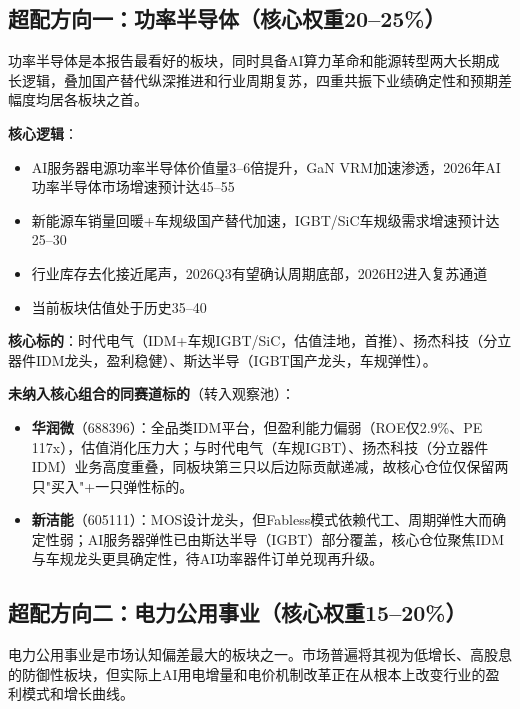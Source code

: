 \subsection{超配方向一：功率半导体（核心权重20--25\%）}

功率半导体是本报告最看好的板块，同时具备AI算力革命和能源转型两大长期成长逻辑，叠加国产替代纵深推进和行业周期复苏，四重共振下业绩确定性和预期差幅度均居各板块之首。

\textbf{核心逻辑}：
\vspace{0.2em}
\begin{itemize}[leftmargin=2em]
\item AI服务器电源功率半导体价值量3--6倍提升，GaN VRM加速渗透，2026年AI功率半导体市场增速预计达45--55%
\item 新能源车销量回暖+车规级国产替代加速，IGBT/SiC车规级需求增速预计达25--30%
\item 行业库存去化接近尾声，2026Q3有望确认周期底部，2026H2进入复苏通道
\item 当前板块估值处于历史35--40%
\end{itemize}

\textbf{核心标的}：时代电气（IDM+车规IGBT/SiC，估值洼地，首推）、扬杰科技（分立器件IDM龙头，盈利稳健）、斯达半导（IGBT国产龙头，车规弹性）。

\textbf{未纳入核心组合的同赛道标的}（转入观察池）：
\vspace{0.2em}
\begin{itemize}[leftmargin=2em]
\item \textbf{华润微}（688396）：全品类IDM平台，但盈利能力偏弱（ROE仅2.9\%、PE 117x），估值消化压力大；与时代电气（车规IGBT）、扬杰科技（分立器件IDM）业务高度重叠，同板块第三只以后边际贡献递减，故核心仓位仅保留两只"买入"+一只弹性标的。
\item \textbf{新洁能}（605111）：MOS设计龙头，但Fabless模式依赖代工、周期弹性大而确定性弱；AI服务器弹性已由斯达半导（IGBT）部分覆盖，核心仓位聚焦IDM与车规龙头更具确定性，待AI功率器件订单兑现再升级。
\end{itemize}

\subsection{超配方向二：电力公用事业（核心权重15--20\%）}

电力公用事业是市场认知偏差最大的板块之一。市场普遍将其视为低增长、高股息的防御性板块，但实际上AI用电增量和电价机制改革正在从根本上改变行业的盈利模式和增长曲线。

